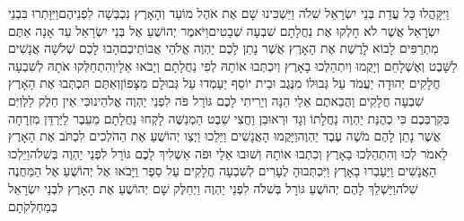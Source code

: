 \documentclass[../main/main.tex]{subfiles}
\begin{document}
\begin{multicols*}{\ncols}
וַיִּקָּהֲלוּ כָּל עֲדַת בְּנֵי יִשְׂרָאֵל שִׁלֹה וַיַּשְׁכִּינוּ שָׁם אֶת אֹהֶל מוֹעֵד וְהָאָרֶץ נִכְבְּשָׁה לִפְנֵיהֶם\PreVerseSpace{}וַיִּוָּתְרוּ בִּבְנֵי יִשְׂרָאֵל אֲשֶׁר לֹא חָלְקוּ אֶת נַחֲלָתָם שִׁבְעָה שְׁבָטִים\PreVerseSpace{}וַיֹּאמֶר יְהוֹשֻׁעַ אֶל בְּנֵי יִשְׂרָאֵל עַד אָנָה אַתֶּם מִתְרַפִּים לָבוֹא לָרֶשֶׁת אֶת הָאָרֶץ אֲשֶׁר נָתַן לָכֶם יַהְוֶה אֱלֹהֵי אֲבוֹתֵיכֶם\PreVerseSpace{}הָבוּ לָכֶם שְׁלֹשָׁה אֲנָשִׁים לַשָּׁבֶט וְאֶשְׁלָחֵם וְיָקֻמוּ וְיִתְהַלְּכוּ בָאָרֶץ וְיִכְתְּבוּ אוֹתָהּ לְפִי נַחֲלָתָם וְיָבֹאוּ אֵלָי\PreVerseSpace{}וְהִתְחַלְּקוּ אֹתָהּ לְשִׁבְעָה חֲלָקִים יְהוּדָה יַעֲמֹד עַל גְּבוּלוֹ מִנֶּגֶב וּבֵית יוֹסֵף יַעַמְדוּ עַל גְּבוּלָם מִצָּפוֹן\PreVerseSpace{}וְאַתֶּם תִּכְתְּבוּ אֶת הָאָרֶץ שִׁבְעָה חֲלָקִים וַהֲבֵאתֶם אֵלַי הֵנָּה וְיָרִיתִי לָכֶם גּוֹרָל פֹּה לִפְנֵי יַהְוֶה אֱלֹהֵינוּ\PreVerseSpace{}כִּי אֵין חֵלֶק לַלְוִיִּם בְּקִרְבְּכֶם כִּי כְהֻנַּת יַהְוֶה נַחֲלָתוֹ וְגָד וּרְאוּבֵן וַחֲצִי שֵׁבֶט הַמְנַשֶּׁה לָקְחוּ נַחֲלָתָם מֵעֵבֶר לַיַּרְדֵּן מִזְרָחָה אֲשֶׁר נָתַן לָהֶם מֹשֶׁה עֶבֶד יַהְוֶה\PreVerseSpace{}וַיָּקֻמוּ הָאֲנָשִׁים וַיֵּלֵכוּ וַיְצַו יְהוֹשֻׁעַ אֶת הַהֹלְכִים לִכְתֹּב אֶת הָאָרֶץ לֵאמֹר לְכוּ וְהִתְהַלְּכוּ בָאָרֶץ וְכִתְבוּ אוֹתָהּ וְשׁוּבוּ אֵלַי וּפֹה אַשְׁלִיךְ לָכֶם גּוֹרָל לִפְנֵי יַהְוֶה בְּשִׁלֹה\PreVerseSpace{}וַיֵּלְכוּ הָאֲנָשִׁים וַיַּעַבְרוּ בָאָרֶץ וַיִּכְתְּבוּהָ לֶעָרִים לְשִׁבְעָה חֲלָקִים עַל סֵפֶר וַיָּבֹאוּ אֶל יְהוֹשֻׁעַ אֶל הַמַּחֲנֶה שִׁלֹה\PreVerseSpace{}וַיַּשְׁלֵךְ לָהֶם יְהוֹשֻׁעַ גּוֹרָל בְּשִׁלֹה לִפְנֵי יַהְוֶה וַיְחַלֶּק שָׁם יְהוֹשֻׁעַ אֶת הָאָרֶץ לִבְנֵי יִשְׂרָאֵל כְּמַחְלְקֹתָם\OpenSection{}\par

\end{multicols*}
\end{document}
